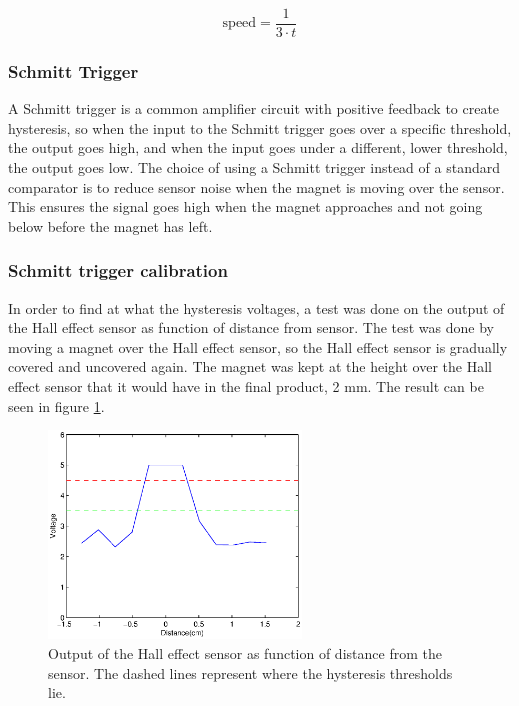 \begin{equation} \label{eq:calc_speed}
 \text{speed} = \frac{1}{3\cdot t}
\end{equation}

\subsubsection{Schmitt Trigger}
A Schmitt trigger is a common amplifier circuit with positive feedback to create hysteresis, so when the input to the Schmitt trigger goes over a specific threshold, the output goes high, and when the input goes under a different, lower threshold, the output goes low.
The choice of using a Schmitt trigger instead of a standard comparator is to reduce sensor noise when the magnet is moving over the sensor.
This ensures the signal goes high when the magnet approaches and not going below before the magnet has left.

\subsubsection{Schmitt trigger calibration} \label{sec:schmitt_cal}
In order to find at what the hysteresis voltages, a test was done on the output of the Hall effect sensor as function of distance from sensor.
The test was done by moving a magnet over the Hall effect sensor, so the Hall effect sensor is gradually covered and uncovered again. The magnet was kept at the height over the Hall effect sensor that it would have in the final product, 2 mm. 
The result can be seen in figure \ref{fig:hall_out}.

\begin{figure}[h]
 \centering
 \includegraphics[width=0.6\textwidth]{img/hall_out}
 \caption{Output of the Hall effect sensor as function of distance from the sensor. The dashed lines represent where the hysteresis thresholds lie.}
 \label{fig:hall_out}
\end{figure}

